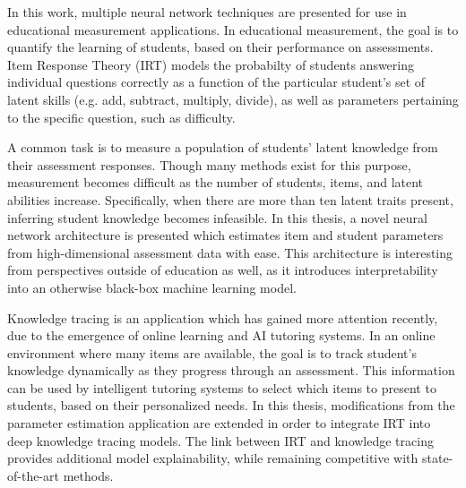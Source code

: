 In this work, multiple neural network techniques are presented for use in educational measurement applications. In educational measurement, the goal is to quantify the learning of students, based on their performance on assessments. Item Response Theory (IRT) models the probabilty of students answering individual questions correctly as a function of the particular student's set of latent skills (e.g. add, subtract, multiply, divide), as well as parameters pertaining to the specific question, such as difficulty.

A common task is to measure a population of students' latent knowledge from their assessment responses. Though many methods exist for this purpose, measurement becomes difficult as the number of students, items, and latent abilities increase. Specifically, when there are more than ten latent traits present, inferring student knowledge becomes infeasible. In this thesis, a novel neural network architecture is presented which estimates item and student parameters from high-dimensional assessment data with ease. This architecture is interesting from perspectives outside of education as well, as it introduces interpretability into an otherwise black-box machine learning model.

Knowledge tracing is an application which has gained more attention recently, due to the emergence of online learning and AI tutoring systems. In an online environment where many items are available, the goal is to track student's knowledge dynamically as they progress through an assessment. This information can be used by intelligent tutoring systems to select which items to present to students, based on their personalized needs. In this thesis, modifications from the parameter estimation application are extended in order to integrate IRT into deep knowledge tracing models. The link between IRT and knowledge tracing provides additional model explainability, while remaining competitive with state-of-the-art methods.

